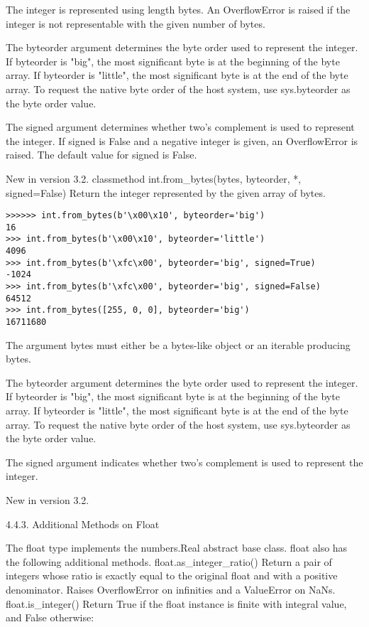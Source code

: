 The integer is represented using length bytes. An OverflowError is raised if the integer is not representable with the given number of bytes.

The byteorder argument determines the byte order used to represent the integer. If byteorder is "big", the most significant byte is at the beginning of the byte array. If byteorder is "little", the most significant byte is at the end of the byte array. To request the native byte order of the host system, use sys.byteorder as the byte order value.

The signed argument determines whether two’s complement is used to represent the integer. If signed is False and a negative integer is given, an OverflowError is raised. The default value for signed is False.


New in version 3.2.
classmethod int.from\_bytes(bytes, byteorder, *, signed=False)
Return the integer represented by the given array of bytes.

\begin{lstlisting}
>>>>>> int.from_bytes(b'\x00\x10', byteorder='big')
16
>>> int.from_bytes(b'\x00\x10', byteorder='little')
4096
>>> int.from_bytes(b'\xfc\x00', byteorder='big', signed=True)
-1024
>>> int.from_bytes(b'\xfc\x00', byteorder='big', signed=False)
64512
>>> int.from_bytes([255, 0, 0], byteorder='big')
16711680
\end{lstlisting}

The argument bytes must either be a bytes-like object or an iterable producing bytes.

The byteorder argument determines the byte order used to represent the integer. If byteorder is "big", the most significant byte is at the beginning of the byte array. If byteorder is "little", the most significant byte is at the end of the byte array. To request the native byte order of the host system, use sys.byteorder as the byte order value.

The signed argument indicates whether two’s complement is used to represent the integer.


New in version 3.2.


4.4.3. Additional Methods on Float

The float type implements the numbers.Real abstract base class. float also has the following additional methods.
float.as\_integer\_ratio()
Return a pair of integers whose ratio is exactly equal to the original float and with a positive denominator. Raises OverflowError on infinities and a ValueError on NaNs.
float.is\_integer()
Return True if the float instance is finite with integral value, and False otherwise:

